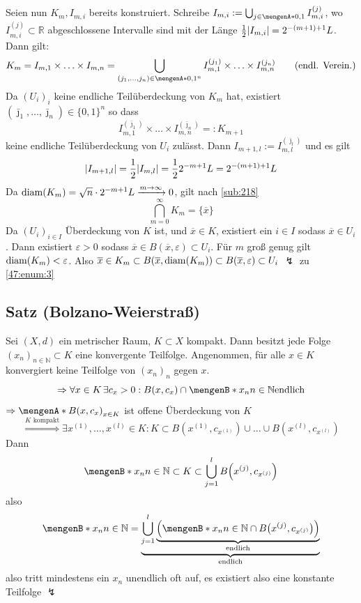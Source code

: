 \begin{description}
	Seien nun $K_m, I_{m,i}$ bereits konstruiert. Schreibe $I_{m,i} := \bigcup_{j \in \set{0,1} } I_{m,i}^{(j)}$, wo $I_{m,i}^{(j)} \subset \mathds{R}$ abgeschlossene
	Intervalle sind mit der Länge $\frac{1}{2} \abs*{I_{m,i}} = 2^{-(m+1)+1} L$. Dann gilt:
	\[
		K_m = I_{m,1} \times \ldots \times I_{m,n} = \bigcup_{(j_1, \ldots , j_n) \in \set{0,1}^n } I_{m,1}^{(j_1)} \times \ldots \times I_{m,n}^{(j_n)} \tag{endl. Verein.}
	\]
	Da $(U_i)_i$ keine endliche Teilüberdeckung von $K_m$ hat, existiert $(\bar \jmath_1, \ldots , \bar \jmath_n  ) \in \{ 0,1 \}^n$ so dass 
	\[
		I_{m,1}^{(\bar \jmath_1 )} \times \ldots \times I_{m,n}^{(\bar \jmath_n)} =: K_{m+1}
	\]
	keine endliche Teilüberdeckung von $U_i$ zulässt. Dann $I_{m+1, l} := I_{m,l}^{(\bar \jmath_l )}$ und es gilt
	\[
		\abs*{ I_{m+1,l}} = \frac{1}{2} \abs*{I_{m,l}} = \frac{1}{2} 2^{-m+1} L = 2^{-(m+1) +1} L  
	\]
	Da $\operatorname{diam} (K_m) = \sqrt{n} \cdot 2^{-m+1} L  \xrightarrow{m \to \infty} 0  $, gilt nach \ref{sub:218} 
	\[
		\bigcap_{m=0}^{\infty} K_m = \{ \overline{x} \} 
	\]
	Da $(U_i)_{i\in I}$ Überdeckung von $K$ ist, und $\overline{x} \in K$, existiert ein $i \in I$ sodass $\overline{x} \in U_i$. Dann existiert $\varepsilon >0$ sodass 
	$\overline{x} \in B(\overline{x}, \varepsilon ) \subset U_i$. Für $m$ groß genug gilt $\operatorname{diam} (K_m) < \varepsilon$.  Also 
	$\overline{x} \in K_m \subset B(\overline{x} , \operatorname{diam}(K_m)) \subset B(\overline{x}, \varepsilon) \subset U_i $ {\large$\lightning$} zu  \ref{47:enum:3} \bewende
\end{description}

\subsection{Satz (Bolzano-Weierstraß)} %
\label{sub:48}
Sei $(X,d)$ ein metrischer Raum, $K \subset X$ kompakt. Dann besitzt jede Folge $(x_n)_{n \in \mathds{N}} \subset K$ eine konvergente Teilfolge.
Angenommen, für alle $x \in K$ konvergiert keine Teilfolge von $(x_n)_{n}$ gegen $x$.\\
\[
	\Rightarrow \forall x \in K \, \exists c_x >0 : B(x, c_x) \cap \set[x_n]{n \in \mathds{N} } \text{endlich}  
\]
$\Rightarrow  \set{B(x, c_x)}_{x \in K} $ ist offene Überdeckung von $K$ 
\[
	\stackrel{K \text{ kompakt}}{\Longrightarrow} \exists x^{(1)}, \ldots , x^{(l)} \in K : K \subset B(x^{(1)}, c_{x^{(1)}}) \cup \ldots \cup B(x^{(l)}, c_{x^{(l)}})
\]
Dann
\[
	\set[x_n]{n \in \mathds{N} } \subset K \subset \bigcup_{j=1}^{l} B\Big(x^{(j)}, c_{x^{(j)}}\Big) 
\]
also 
\[
	\set[x_n]{n \in \mathds{N}} =  \underbrace{\bigcup_{j=1}^{l} \underbrace{\enbrace*{ \set[x_n]{n \in \mathds{N}} \cap B\big(x^{(j)}, c_{x^{(j)}}\big) }}_{\text{endlich}} }_{\text{endlich}}
\]
also tritt mindestens ein $x_n$ unendlich oft auf, es existiert also eine konstante Teilfolge {\large $\lightning$} \bewende

